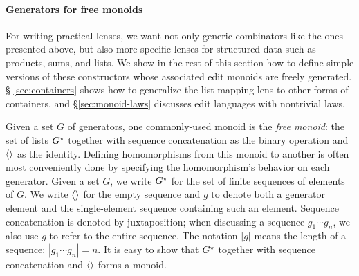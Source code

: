 \paragraph*{Generators for free monoids}
For writing practical lenses, we want not only generic combinators like the
ones presented above, but also more specific lenses for structured data
such as products, sums, and lists.
%
We show in the rest of this section how to define simple versions of these
constructors whose associated edit monoids are freely generated.  \S
\ref{sec:containers} shows how to generalize the list mapping lens to other
forms of containers, and \S \ref{sec:monoid-laws} discusses edit languages
with nontrivial laws.

\ifdissertation
Given a set $G$ of generators, one commonly-used monoid is the \emph{free
monoid}: the set of lists $G^\star$ together with sequence concatenation as
the binary operation and $\left<\right>$ as the identity.  Defining homomorphisms
from this monoid to another is often most conveniently done by specifying
the homomorphism's behavior on each generator.
\else
Given a set $G$, we write $G^\star$ for the set of finite sequences of
elements of $G$. We write $\left<\right>$ for the empty
sequence and $g$ to denote both a generator element 
and the single-element sequence containing such an element. 
Sequence concatenation is denoted by juxtaposition; when discussing a sequence
$g_1 \cdots g_n$, we also use $g$ to refer to the entire sequence. The
notation $|g|$ means the length of a sequence: $|g_1 \cdots g_n|=n$. It
is easy to show that $G^\star$ together with sequence concatenation and
$\left<\right>$ forms a monoid.

